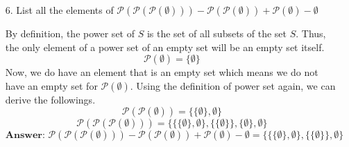 \begin{enumerate}
    \item[6.]
    List all the elements of $\mathcal{P}(\mathcal{P}(\mathcal{P}(\emptyset))) - \mathcal{P}(\mathcal{P}(\emptyset)) + \mathcal{P}(\emptyset) - \emptyset$
    \begin{solution}
        By definition, the power set of $S$ is the set of all subsets of the set $S$. Thus, the only element of a power set of an empty set will be an empty set itself.
        $$\mathcal{P}(\emptyset) = \{\emptyset\}$$
        Now, we do have an element that is an empty set which means we do not have an empty set for $\mathcal{P}(\emptyset)$. Using the definition of power set again, we can derive the followings.
        $$\mathcal{P}(\mathcal{P}(\emptyset)) = \{\{\emptyset\},\emptyset\}$$
        $$\mathcal{P}(\mathcal{P}(\mathcal{P}(\emptyset))) = \{
            \{\{\emptyset\},\emptyset\},
            \{\{\emptyset\}\},
            \{\emptyset\},
            \emptyset
        \}$$
        $$\textbf{Answer: }\mathcal{P}(\mathcal{P}(\mathcal{P}(\emptyset))) - \mathcal{P}(\mathcal{P}(\emptyset)) + \mathcal{P}(\emptyset) - \emptyset = \{
            \{\{\emptyset\},\emptyset\},
            \{\{\emptyset\}\},
            \emptyset
        \}$$
    \end{solution}


    
\end{enumerate}